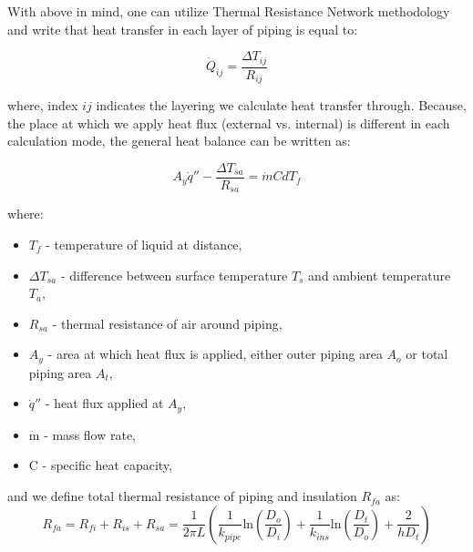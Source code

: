 \documentclass[10pt, letterpaper]{article}
\begin{document}
	With above in mind, one can utilize Thermal Resistance Network methodology and write that heat transfer in each layer of piping is equal to:

	\begin{equation}
		\dot{Q}_{ij} = \frac{\Delta{T_{ij}}}{R_{ij}}
		\label{eq:thermal resistance definition}
	\end{equation}

	where, index $ij$ indicates the layering we calculate heat transfer through.
	Because, the place at which we apply heat flux (external vs. internal) is different in each calculation mode, the general heat balance can be written as:

	\begin{equation}
		A_{y} \dot{q}'' - \frac{\Delta{T_{sa}}}{R_{sa}} = \dot{m} C dT_{f}
		\label{eq:general energy balance}
	\end{equation}

	\noindent where:
	\begin{itemize}
		\item $T_{f}$ - temperature of liquid at distance,
		\item $\Delta{T_{sa}}$ - difference between surface temperature $T_{s}$ and ambient temperature $T_{a}$,
		\item $R_{sa}$ - thermal resistance of air around piping,
		\item $A_{y}$ - area at which heat flux is applied, either outer piping area $A_{o}$ or total piping area $A_{t}$,
		\item $\dot{q}''$ - heat flux applied at $A_{y}$,
		\item $\dot{\text{m}}$ - mass flow rate,
		\item $\text{C}$ - specific heat capacity,
	\end{itemize}

    \noindent and we define total thermal resistance of piping and insulation $R_{fa}$ as:
    \begin{equation}
        R_{fa} = R_{fi} + R_{is} + R_{sa} =
		\frac{1}{2 \pi L}
		\left(
		\frac{1}{k_{pipe}} \text{ln} \left ( \frac{D_{o}}{D_{i}} \right ) + 
        \frac{1}{k_{ins}} \text{ln} \left ( \frac{D_{t}}{D_{o}} \right ) +
        \frac{2}{h D_{t}}
		\right)
		\label{eq:K_definition}
    \end{equation}
\end{document}
